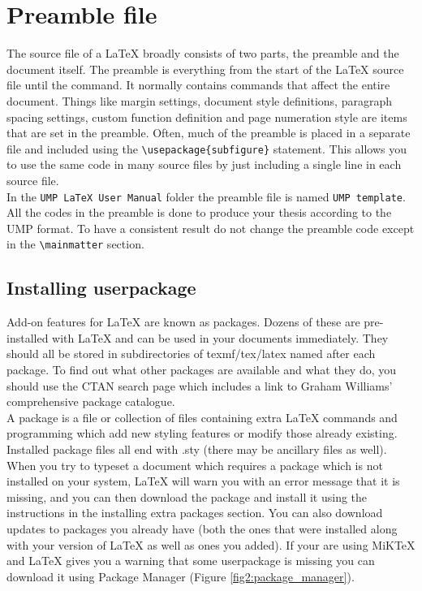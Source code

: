\section{Preamble file}

The source file of a LaTeX broadly consists of two parts, the preamble and the document itself. The preamble is everything from the start of the LaTeX source file until the \verb++ command. It normally contains commands that affect the entire document. Things like margin settings, document style definitions, paragraph spacing settings, custom function definition and page numeration style are items that are set in the preamble. Often, much of the preamble is placed in a separate file and included using the \verb+\usepackage{subfigure}+ statement. This allows you to use the same code in many source files by just including a single line in each source file.\\

In the \verb+UMP LaTeX User Manual+ folder the preamble file is named \verb+UMP template+. All the codes in the preamble is done to produce your thesis according to the UMP format. To have a consistent result do not change the preamble code except in the \verb+\mainmatter+ section.  

\subsection{Installing userpackage}

Add-on features for {\LaTeX} are known as packages. Dozens of these are pre-installed with {\LaTeX} and can be used in your documents immediately. They should all be stored in subdirectories of texmf/tex/latex named after each package. To find out what other packages are available and what they do, you should use the CTAN search page which includes a link to Graham Williams' comprehensive package catalogue.\\ 

A package is a file or collection of files containing extra LaTeX commands and programming which add new styling features or modify those already existing. Installed package files all end with .sty (there may be ancillary files as well). When you try to typeset a document which requires a package which is not installed on your system, {\LaTeX} will warn you with an error message that it is missing, and you can then download the package and install it using the instructions in the installing extra packages section. You can also download updates to packages you already have (both the ones that were installed along with your version of {\LaTeX} as well as ones you added). If your are using MiKTeX and {\LaTeX} gives you a warning that some userpackage is missing you can download it using Package Manager (Figure \ref{fig2:package_manager}).

